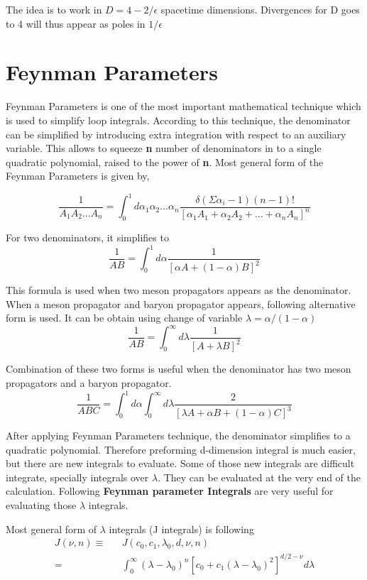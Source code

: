 \documentclass{article}
\newcommand{\beq}{\begin{equation}}
\newcommand{\eeq}{\end{equation}}
\newcommand{\bea}{\begin{eqnarray}}
\newcommand{\eea}{\end{eqnarray}}
\begin{document}
The idea is to work in $D = 4 - 2/\epsilon$ spacetime dimensions. Divergences for D goes to 4 will thus
appear as poles in $1/\epsilon$

\newpage
\section{Feynman Parameters}

 Feynman Parameters is one of the most important mathematical technique which is used to simplify loop integrals. According to this technique, the denominator can be simplified by introducing extra integration with respect to an auxiliary variable. This allows to squeeze \textbf{n} number of denominators in to a single quadratic polynomial, raised to the power of \textbf{n}. Most general form of the Feynman Parameters is given by,\cite{Peskin1995}

\beq
\frac{1}{A_1A_2...A_n} =  \int_{0}^{1} d\alpha_1 \alpha_2...\alpha_n   \frac{\delta \left( \Sigma \alpha_i -1 \right) (n-1)!}{ \left[ \alpha_1 A_1+ \alpha_2 A_2 +...+ \alpha_n A_n \right] ^n }  
\eeq

\vspace{5mm}
For two denominators, it simplifies to
\beq
\frac{1}{AB} =  \int_{0}^{1} d\alpha   \frac{1}{ \left[ \alpha A+(1-\alpha) B \right] ^2 }  
\eeq

This formula is used when two meson propagators appears as the denominator. When a meson propagator and baryon propagator appears, following alternative form is used. It can be obtain using change of variable $\lambda=\alpha/(1-\alpha)$
\beq
\frac{1}{AB} =  \int_{0}^{\infty} d\lambda  \frac{1}{ \left[ A+\lambda B \right] ^2 } 
\eeq

Combination of these two forms is useful when the denominator has two meson propagators and a baryon propagator.
\beq
\frac{1}{ABC} =  \int_{0}^{1} d\alpha  \int_{0}^{\infty} d\lambda  \frac{2}{ \left[ \lambda A + \alpha B+(1-\alpha) C \right] ^3 }  
\eeq

After applying Feynman Parameters technique, the denominator simplifies to a quadratic polynomial. Therefore preforming d-dimension integral is much easier, but there are new integrals to evaluate. Some of those new integrals are difficult integrate, specially integrals over $\lambda$. They can be evaluated at the very end of the calculation. Following \textbf{Feynman parameter Integrals} are very useful for evaluating those $\lambda$ integrals.

 

\vspace{5mm}
Most general form of $\lambda$ integrals (J integrals) is following
\bea
J\left( \nu, n \right) \equiv &&J\left( c_0 , c_1, \lambda_0, d, \nu, n \right) 
\nonumber\\
=&&\int_{0}^{\infty} \left( \lambda-\lambda_0\right)^n \left[ c_0 + c_1 \left( \lambda-\lambda_0\right)^2   \right]^{d/2-\nu} d\lambda
\eea
\end{document}
